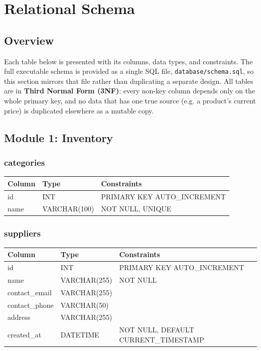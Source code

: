 \documentclass[11pt,a4paper]{report}
\newcommand{\schemahead}{%
  \toprule
  \textbf{Column} & \textbf{Type} & \textbf{Constraints} \\
  \midrule
}
\begin{document}
\chapter{Relational Schema}

\section{Overview}
Each table below is presented with its columns, data types, and constraints.
The full executable schema is provided as a single SQL file,
\texttt{database/schema.sql}, so this section mirrors that file rather than
duplicating a separate design. All tables are in \textbf{Third Normal Form
(3NF)}: every non-key column depends only on the whole primary key, and no
data that has one true source (e.g. a product's current price) is
duplicated elsewhere as a mutable copy.

\section{Module 1: Inventory}

\subsection*{categories}
\begin{center}
\begin{tabular}{@{}p{3.4cm}p{2.6cm}p{7.5cm}@{}}
\schemahead
id & INT & PRIMARY KEY AUTO\_INCREMENT \\
name & VARCHAR(100) & NOT NULL, UNIQUE \\
\bottomrule
\end{tabular}
\end{center}

\subsection*{suppliers}
\begin{center}
\begin{tabular}{@{}p{3.4cm}p{2.6cm}p{7.5cm}@{}}
\schemahead
id & INT & PRIMARY KEY AUTO\_INCREMENT \\
name & VARCHAR(255) & NOT NULL \\
contact\_email & VARCHAR(255) & \\
contact\_phone & VARCHAR(50) & \\
address & VARCHAR(255) & \\
created\_at & DATETIME & NOT NULL, DEFAULT CURRENT\_TIMESTAMP \\
\bottomrule
\end{tabular}
\end{center}
\end{document}
